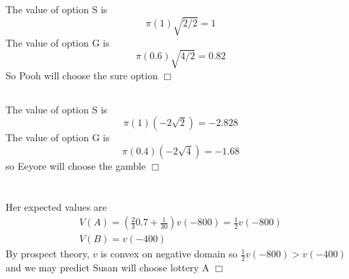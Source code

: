 \documentclass{article}
\begin{document}
\subsection{}
The value of option S is
$$\pi(1) \sqrt{2/2} = 1$$
The value of option G is
$$\pi(0.6)\sqrt{4/2} = 0.82$$
So Pooh will choose the sure option $\Box$

\subsection{}
The value of option S is
$$\pi(1) (-2\sqrt{2}) = -2.828$$
The value of option G is
$$\pi(0.4) (-2\sqrt{4}) = -1.68$$
so Eeyore will choose the gamble $\Box$

\section{}
Her expected values are
\begin{gather*}
V(A) = (\frac{2}{3} 0.7 + \frac{1}{30})v(-800) = \frac{1}{2} v(-800)\\
V(B) = v(-400)
\end{gather*}
By prospect theory, $v$ is convex on negative domain so $\frac{1}{2} v(-800) > v(-400)$ and we may predict Susan will choose lottery A $\Box$
\end{document}
